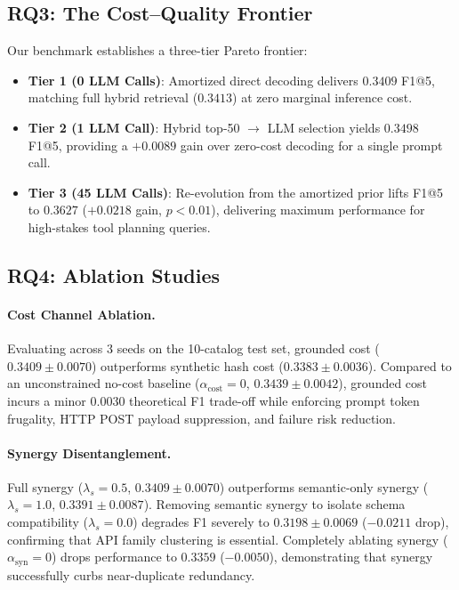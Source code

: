 \subsection{RQ3: The Cost--Quality Frontier}
\label{sec:exp_frontier}

Our benchmark establishes a three-tier Pareto frontier:
\begin{itemize}
    \item \textbf{Tier 1 (0 LLM Calls)}: Amortized direct decoding delivers $0.3409$ F1@5, matching full hybrid retrieval ($0.3413$) at zero marginal inference cost.
    \item \textbf{Tier 2 (1 LLM Call)}: Hybrid top-50 $\to$ LLM selection yields $0.3498$ F1@5, providing a $+0.0089$ gain over zero-cost decoding for a single prompt call.
    \item \textbf{Tier 3 (45 LLM Calls)}: Re-evolution from the amortized prior lifts F1@5 to $0.3627$ ($+0.0218$ gain, $p < 0.01$), delivering maximum performance for high-stakes tool planning queries.
\end{itemize}

\subsection{RQ4: Ablation Studies}
\label{sec:exp_ablation}

\paragraph{Cost Channel Ablation.}
Evaluating across 3 seeds on the 10-catalog test set, grounded cost ($0.3409\pm0.0070$) outperforms synthetic hash cost ($0.3383\pm0.0036$). Compared to an unconstrained no-cost baseline ($\alpha_{\mathrm{cost}}=0$, $0.3439\pm0.0042$), grounded cost incurs a minor $0.0030$ theoretical F1 trade-off while enforcing prompt token frugality, HTTP POST payload suppression, and failure risk reduction.

\paragraph{Synergy Disentanglement.}
Full synergy ($\lambda_s=0.5$, $0.3409\pm0.0070$) outperforms semantic-only synergy ($\lambda_s=1.0$, $0.3391\pm0.0087$). Removing semantic synergy to isolate schema compatibility ($\lambda_s=0.0$) degrades F1 severely to $0.3198\pm0.0069$ ($-0.0211$ drop), confirming that API family clustering is essential. Completely ablating synergy ($\alpha_{\mathrm{syn}}=0$) drops performance to $0.3359$ ($-0.0050$), demonstrating that synergy successfully curbs near-duplicate redundancy.

